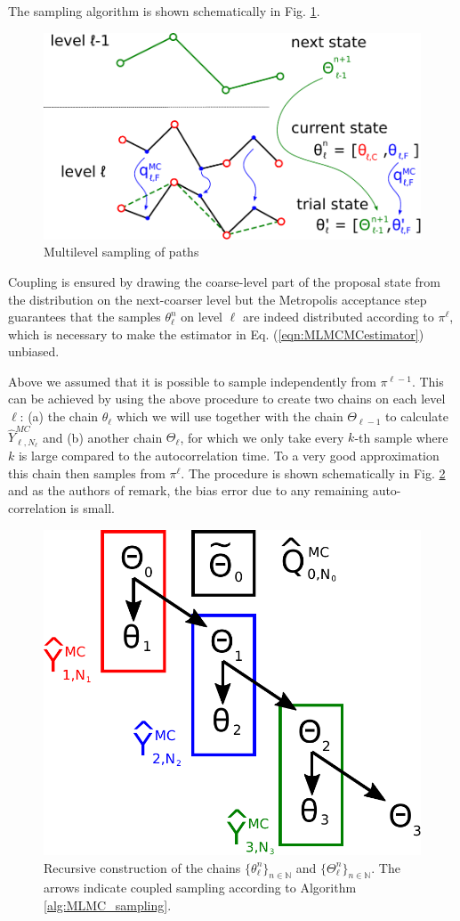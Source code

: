 \documentclass[11pt]{article}
\begin{document}
The sampling algorithm is shown schematically in Fig. \ref{fig:multilevel_path_sampling}.
\begin{figure}
  \begin{center}
    \includegraphics[width=0.6\linewidth]{multilevel_paths.pdf}
    \caption{Multilevel sampling of paths}
    \label{fig:multilevel_path_sampling}
  \end{center}
\end{figure}

Coupling is ensured by drawing the coarse-level part of the proposal state from the distribution on the next-coarser level but the Metropolis acceptance step guarantees that the samples $\theta_\ell^n$ on level $\ell$ are indeed distributed according to $\pi^\ell$, which is necessary to make the estimator in Eq. (\ref{eqn:MLMCMCestimator}) unbiased.

Above we assumed that it is possible to sample independently from $\pi^{\ell-1}$. This can be achieved by using the above procedure to create two chains on each level $\ell$: (a) the chain $\theta_\ell$ which we will use together with the chain $\Theta_{\ell-1}$ to calculate $\hat{Y}_{\ell,N_\ell}^{MC}$ and (b) another chain $\Theta_{\ell}$, for which we only take every $k$-th sample where $k$ is large compared to the autocorrelation time. To a very good approximation this chain then samples from $\pi^\ell$. The procedure is shown schematically in Fig. \ref{fig:chains} and as the authors of \cite{Dodwell2015} remark, the bias error due to any remaining auto-correlation is small.
\begin{figure}
  \begin{center}
    \includegraphics[width=0.3\linewidth]{chains.pdf}
    \caption{Recursive construction of the chains $\{\theta_\ell^n\}_{n\in\mathbb{N}}$ and $\{\Theta_\ell^n\}_{n\in\mathbb{N}}$. The arrows indicate coupled sampling according to Algorithm \ref{alg:MLMC_sampling}.}
    \label{fig:chains}
  \end{center}
\end{figure}
\end{document}
